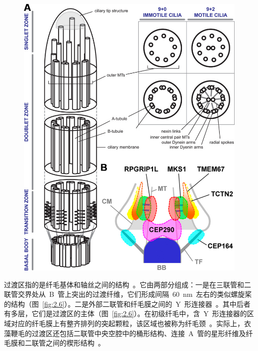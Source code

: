 \begin{figure}[htb!]
\centering
\graphicspath{{figures/}}
\includegraphics[width=\textwidth-10mm]{fig2-6.jpg}
{
\par}
\end{figure}

过渡区指的是纤毛基体和轴丝之间的结构\ \citep{Czarnecki2012}。它由两部分组成：一是在三联管和二联管交界处从\ B\ 管上突出的过渡纤维，它们形成间隔\ \SI{60}{\nm}\ 左右的类似螺旋桨的结构（图\ \ref{fig:2.6}）。二是外部二联管和纤毛膜之间的\ Y\ 形连接器\ \citep{Czarnecki2012}。其中后者有多层，它们是过渡区的主体（图\ \ref{fig:2.6}）。在初级纤毛中，含\ Y\ 形连接器的区域对应的纤毛膜上有整齐排列的突起颗粒，该区域也被称为纤毛颈\ \citep{Czarnecki2012}。实际上，衣藻鞭毛的过渡区还包括二联管中央空腔中的桶形结构、连接\ A\ 管的星形纤维及纤毛膜和二联管之间的楔形结构\ \citep{Czarnecki2012}。


